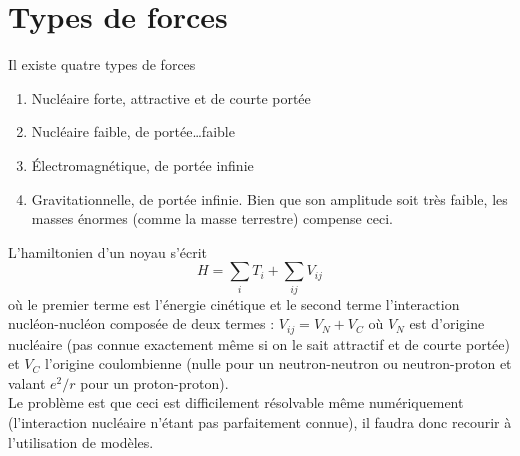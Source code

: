 \section{Types de forces}
Il existe quatre types de forces
\begin{enumerate}
\item Nucléaire forte, attractive et de courte portée
\item Nucléaire faible, de portée\dots faible
\item Électromagnétique, de portée infinie
\item Gravitationnelle, de portée infinie. Bien que son amplitude soit très faible, les masses énormes
(comme la masse terrestre) compense ceci.
\end{enumerate}
L'hamiltonien d'un noyau s'écrit
\begin{equation}
H = \sum_i T_i + \sum_{ij} V_{ij}
\end{equation}
où le premier terme est l'énergie cinétique et le second terme l'interaction nucléon-nucléon composée 
de deux termes : $V_{ij} = V_N+V_C$ où $V_N$ est d'origine nucléaire (pas connue exactement même si on 
le sait attractif et de courte portée) et $V_C$ l'origine coulombienne (nulle pour un neutron-neutron ou 
neutron-proton et valant $e^2/r$ pour un proton-proton).\\

Le problème est que ceci est difficilement résolvable même numériquement (l'interaction nucléaire n'étant
pas parfaitement connue), il faudra donc recourir à l'utilisation de modèles.

